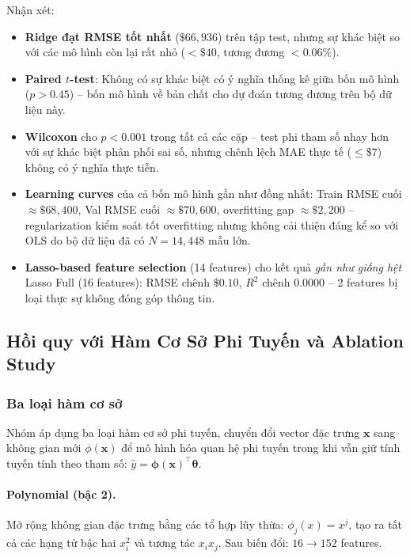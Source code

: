 \documentclass[12pt,a4paper]{article}
\begin{document}
Nhận xét:
\begin{itemize}
  \item \textbf{Ridge đạt RMSE tốt nhất} ($\$66{,}936$) trên tập test,
        nhưng sự khác biệt so với các mô hình còn lại rất nhỏ
        ($< \$40$, tương đương $< 0.06\%$).
  \item \textbf{Paired $t$-test}: Không có sự khác biệt có ý nghĩa
        thống kê giữa bốn mô hình ($p > 0.45$) -- bốn mô hình về bản
        chất cho dự đoán tương đương trên bộ dữ liệu này.
  \item \textbf{Wilcoxon} cho $p < 0.001$ trong tất cả các cặp -- test
        phi tham số nhạy hơn với sự khác biệt phân phối sai số, nhưng
        chênh lệch MAE thực tế ($\leq \$7$) không có ý nghĩa thực tiễn.
  \item \textbf{Learning curves} của cả bốn mô hình gần như đồng nhất:
        Train RMSE cuối $\approx \$68{,}400$, Val RMSE cuối
        $\approx \$70{,}600$, overfitting gap $\approx \$2{,}200$ --
        regularization kiểm soát tốt overfitting nhưng không cải thiện
        đáng kể so với OLS do bộ dữ liệu đã có $N = 14{,}448$ mẫu lớn.
  \item \textbf{Lasso-based feature selection} (14 features) cho kết
        quả \emph{gần như giống hệt} Lasso Full (16 features):
        RMSE chênh $\$0.10$, $R^2$ chênh $0.0000$ -- 2 features bị
        loại thực sự không đóng góp thông tin.
\end{itemize}

\subsection{Hồi quy với Hàm Cơ Sở Phi Tuyến và Ablation Study}
\label{ssec:nonlinear}

\subsubsection{Ba loại hàm cơ sở}

Nhóm áp dụng ba loại hàm cơ sở phi tuyến, chuyển đổi vector đặc trưng
$\mathbf{x}$ sang không gian mới $\phi(\mathbf{x})$ để mô hình hóa quan
hệ phi tuyến trong khi vẫn giữ tính tuyến tính theo tham số:
$\hat{y} = \boldsymbol{\phi}(\mathbf{x})^\top \boldsymbol{\theta}$.

\paragraph{Polynomial (bậc 2).}
Mở rộng không gian đặc trưng bằng các tổ hợp lũy thừa:
$\phi_j(x) = x^j$, tạo ra tất cả các hạng tử bậc hai $x_i^2$ và tương
tác $x_ix_j$. Sau biến đổi: $16 \to 152$ features.
\end{document}
